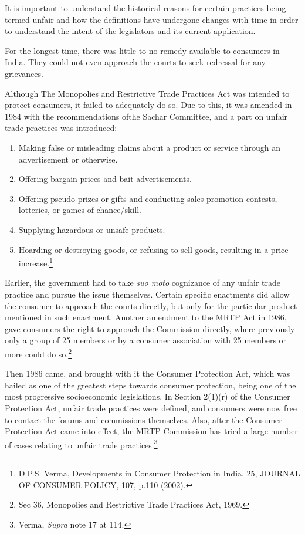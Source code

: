 \begin{multicols}{2}

\noi
It is important to understand the historical reasons for certain practices being termed unfair and
how the definitions have undergone changes with time in order to understand the intent of the
legislators and its current application.

\noi
For the longest time, there was little to no remedy available to consumers in India. They could
not even approach the courts to seek redressal for any grievances.

\noi
Although The Monopolies and Restrictive Trade Practices Act was intended to protect
consumers, it failed to adequately do so. Due to this, it was amended in 1984 with the
recommendations ofthe Sachar Committee, and a part on unfair trade practices was introduced:

\begin{enumerate}
\item[1)] Making false or misleading claims about a product or service through an advertisement or otherwise.

\item[2)] Offering bargain prices and bait advertisements.

\item[3)] Offering pseudo prizes or gifts and conducting sales promotion contests, lotteries, or games of chance/skill.

\item[4)] Supplying hazardous or unsafe products.

\item[5)] Hoarding or destroying goods, or refusing to sell goods, resulting in a price increase.\footnote{D.P.S. Verma, Developments in Consumer Protection in India, 25, JOURNAL OF CONSUMER POLICY, 107, p.110 (2002).}
\end{enumerate}

\noi
Earlier, the government had to take \textit{suo moto} cognizance of any unfair trade practice and pursue
the issue themselves. Certain specific enactments did allow the consumer to approach the courts
directly, but only for the particular product mentioned in such enactment. Another amendment
to the MRTP Act in 1986, gave consumers the right to approach the Commission directly,
where previously only a group of 25 members or by a consumer association with 25 members
or more could do so.\footnote{Sec 36, Monopolies and Restrictive Trade Practices Act, 1969.}

\noi
Then 1986 came, and brought with it the Consumer Protection Act, which was hailed as one of
the greatest steps towards consumer protection, being one of the most progressive socioeconomic legislations. In Section 2(1)(r) of the Consumer Protection Act, unfair trade practices
were defined, and consumers were now free to contact the forums and commissions
themselves. Also, after the Consumer Protection Act came into effect, the MRTP Commission
has tried a large number of cases relating to unfair trade practices.\footnote{Verma, \textit{Supra} note 17 at 114.}


\end{multicols}
